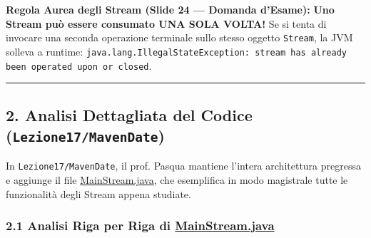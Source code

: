 \documentclass[11pt,a4paper]{article}
\newcommand{\passthrough}[1]{#1}
\begin{document}
\begin{studywarning} \textbf{Regola Aurea degli Stream (Slide 24 --- Domanda
d'Esame):} \textbf{Uno Stream può essere consumato UNA SOLA VOLTA!} Se
si tenta di invocare una seconda operazione terminale sullo stesso
oggetto \passthrough{\lstinline!Stream!}, la JVM solleva a runtime:
\passthrough{\lstinline!java.lang.IllegalStateException: stream has already been operated upon or closed!}.
\end{studywarning}

\begin{center}\rule{0.5\linewidth}{0.5pt}\end{center}

\subsection{\texorpdfstring{2. Analisi Dettagliata del Codice
(\texttt{Lezione17/MavenDate})}{2. Analisi Dettagliata del Codice (Lezione17/MavenDate)}}\label{analisi-dettagliata-del-codice-lezione17mavendate}

In \passthrough{\lstinline!Lezione17/MavenDate!}, il prof. Pasqua
mantiene l'intera architettura pregressa e aggiunge il file
\href{file:///home/wally/Documenti/GitHub/Programmazione-II/25-26/Teoria-e-Esercitazioni/Codice-20260902/Lezione17/MavenDate/src/main/java/it/oop/ui/MainStream.java}{MainStream.java},
che esemplifica in modo magistrale tutte le funzionalità degli Stream
appena studiate.

\subsubsection{\texorpdfstring{2.1 Analisi Riga per Riga di
\href{file:///home/wally/Documenti/GitHub/Programmazione-II/25-26/Teoria-e-Esercitazioni/Codice-20260902/Lezione17/MavenDate/src/main/java/it/oop/ui/MainStream.java}{MainStream.java}}{2.1 Analisi Riga per Riga di MainStream.java}}\label{analisi-riga-per-riga-di-mainstream.java}
\end{document}

